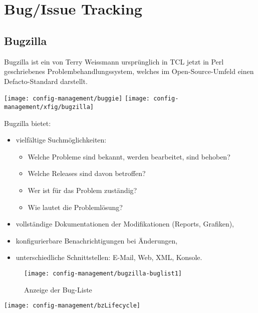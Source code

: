 \newpage
\section{Bug/Issue Tracking}
\subsection{Bugzilla}
Bugzilla ist ein von Terry Weissmann ursprünglich in TCL jetzt in Perl
geschriebenes
Problembehandlungssystem, welches im Open-Source-Umfeld einen
Defacto-Standard darstellt.
\begin{center}
\texttt{[image: config-management/buggie]}\hfill
\texttt{[image: config-management/xfig/bugzilla]}
\end{center}
Bugzilla bietet:

\begin{minipage}{0.48\linewidth}
\begin{itemize}
\item vielfältige Suchmöglichkeiten:
  \begin{itemize}
  \item Welche Probleme sind bekannt, werden bearbeitet, sind behoben?
  \item Welche Releases sind davon betroffen?
  \item Wer ist für das Problem zuständig?
  \item Wie lautet die Problemlösung?
  \end{itemize}
\end{itemize}
\end{minipage}\hfill
\begin{minipage}{0.48\linewidth}
\begin{itemize}
\item vollständige Dokumentationen der Modifikationen (Reports, Grafiken),
\item konfigurierbare Benachrichtigungen bei \"Anderungen,
\item unterschiedliche Schnittstellen: E-Mail, Web, XML, Konsole.
\end{itemize}
\end{minipage}
\begin{figure}[H]
\centering
\texttt{[image: config-management/bugzilla-buglist1]}
\caption{Anzeige der Bug-Liste}
\end{figure}
\newpage
\ifslides
\begin{center}
\texttt{[image: config-management/bzLifecycle]}
\end{center}
\else
